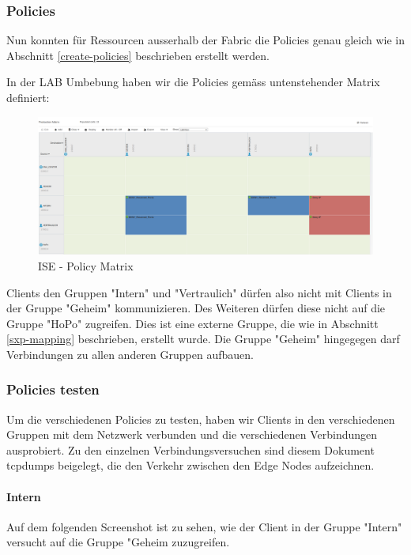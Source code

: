 \subsubsection{Policies}
Nun konnten für Ressourcen ausserhalb der Fabric die Policies genau gleich wie in Abschnitt \ref{create-policies} beschrieben erstellt werden.

In der LAB Umbebung haben wir die Policies gemäss untenstehender Matrix definiert:

\begin{figure}[H]
	\centering
	\includegraphics[width=14cm]{img/secondtry/ise-policy-matrix.png}
	\caption{ISE - Policy Matrix}
	\label{fig:ise-policy-matrix}
\end{figure}

Clients den Gruppen "Intern" und "Vertraulich" dürfen also nicht mit Clients in der Gruppe "Geheim" kommunizieren. Des Weiteren dürfen diese nicht auf die Gruppe "HoPo" zugreifen. Dies ist eine externe Gruppe, die wie in Abschnitt \ref{sxp-mapping} beschrieben, erstellt wurde. Die Gruppe "Geheim" hingegegen darf Verbindungen zu allen anderen Gruppen aufbauen.

\subsubsection{Policies testen}

Um die verschiedenen Policies zu testen, haben wir Clients in den verschiedenen Gruppen mit dem Netzwerk verbunden und die verschiedenen Verbindungen ausprobiert.
Zu den einzelnen Verbindungsversuchen sind diesem Dokument tcpdumps beigelegt, die den Verkehr zwischen den Edge Nodes aufzeichnen.

\paragraph{Intern}

Auf dem folgenden Screenshot ist zu sehen, wie der Client in der Gruppe "Intern" versucht auf die Gruppe "Geheim zuzugreifen.

